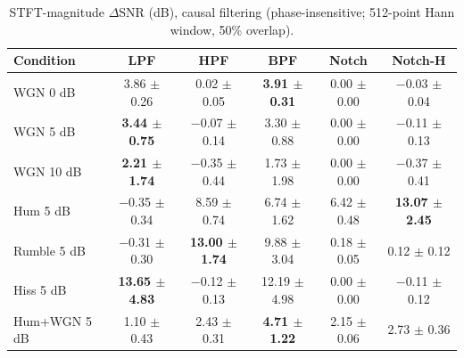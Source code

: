 \begin{table}[!t]
\caption{STFT-magnitude $\Delta$SNR (dB), causal filtering (phase-insensitive; 512-point Hann window, 50\% overlap).}
\label{tab:dsnr_mag}
\centering\footnotesize
\begin{tabular}{lccccc}
\hline
Condition & LPF & HPF & BPF & Notch & Notch-H \\ \hline
WGN 0 dB & 3.86 $\pm$ 0.26 & 0.02 $\pm$ 0.05 & \textbf{3.91 $\pm$ 0.31} & 0.00 $\pm$ 0.00 & $-$0.03 $\pm$ 0.04 \\
WGN 5 dB & \textbf{3.44 $\pm$ 0.75} & $-$0.07 $\pm$ 0.14 & 3.30 $\pm$ 0.88 & 0.00 $\pm$ 0.00 & $-$0.11 $\pm$ 0.13 \\
WGN 10 dB & \textbf{2.21 $\pm$ 1.74} & $-$0.35 $\pm$ 0.44 & 1.73 $\pm$ 1.98 & 0.00 $\pm$ 0.00 & $-$0.37 $\pm$ 0.41 \\
Hum 5 dB & $-$0.35 $\pm$ 0.34 & 8.59 $\pm$ 0.74 & 6.74 $\pm$ 1.62 & 6.42 $\pm$ 0.48 & \textbf{13.07 $\pm$ 2.45} \\
Rumble 5 dB & $-$0.31 $\pm$ 0.30 & \textbf{13.00 $\pm$ 1.74} & 9.88 $\pm$ 3.04 & 0.18 $\pm$ 0.05 & 0.12 $\pm$ 0.12 \\
Hiss 5 dB & \textbf{13.65 $\pm$ 4.83} & $-$0.12 $\pm$ 0.13 & 12.19 $\pm$ 4.98 & 0.00 $\pm$ 0.00 & $-$0.11 $\pm$ 0.12 \\
Hum+WGN 5 dB & 1.10 $\pm$ 0.43 & 2.43 $\pm$ 0.31 & \textbf{4.71 $\pm$ 1.22} & 2.15 $\pm$ 0.06 & 2.73 $\pm$ 0.36 \\
\hline
\end{tabular}

\end{table}